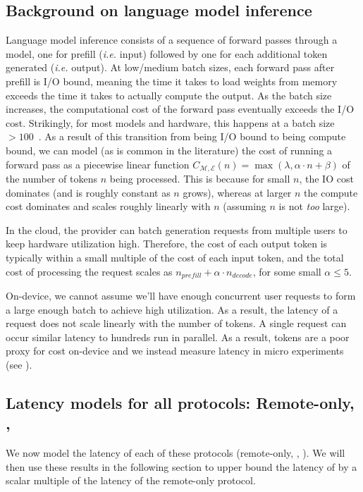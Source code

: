 \subsection{Background on language model inference}
\label{app:edgecost_background}
Language model inference consists of a sequence of forward passes through a model, one for prefill (\textit{i.e.} input) followed by one for each additional token generated (\textit{i.e.} output). 
At low/medium batch sizes, each forward pass after prefill is I/O bound, meaning the time it takes to load weights from memory exceeds the time it takes to actually compute the output. 
As the batch size increases, the computational cost of the forward pass eventually exceeds the I/O cost. 
Strikingly, for most models and hardware, this happens at a batch size $>100$~\citep{leviathan2023fast,chen2024sequoia}.
As a result of this transition from being I/O bound to being compute bound, we can model (as is common in the literature) the cost of running a forward pass as a piecewise linear function $C_{\mathcal{M}, \mathcal{E}}(n) = \max(\lambda, \alpha \cdot n + \beta)$ of the number of tokens $n$ being processed.
This is because for small $n$, the IO cost dominates (and is roughly constant as $n$ grows), whereas at larger $n$ the compute cost dominates and scales roughly linearly with $n$ (assuming $n$ is not \textit{too} large).

In the cloud, the provider can batch generation requests from multiple users to keep hardware utilization high.
Therefore, the cost of each output token is typically within a small multiple of the cost of each input token, and the total cost of processing the request scales as $n_{prefill} + \alpha \cdot n_{decode}$, for some small $\alpha \leq 5$. 

On-device, we cannot assume we'll have enough concurrent user requests to form a large enough batch to achieve high utilization. As a result, the latency of a request does not scale linearly with the number of tokens. A single request can occur similar latency to hundreds run in parallel. As a result, tokens are a poor proxy for cost on-device and we instead measure latency in micro experiments (see ). 

\subsection{Latency models for all protocols: Remote-only, \naive, \system}
\label{app:edgecost_models}
We now model the latency of each of these protocols (remote-only, \naive, \system).
We will then use these results in the following section to upper bound the latency of \system by a scalar multiple of the latency of the remote-only protocol.

